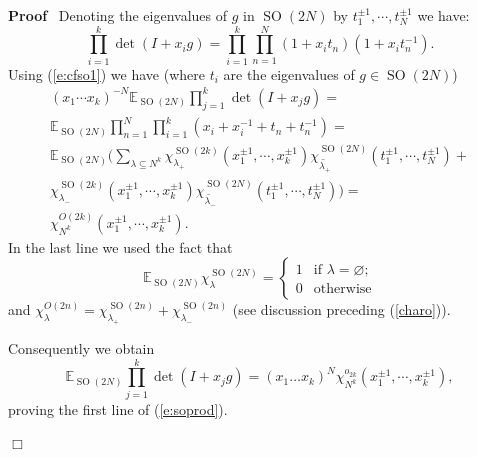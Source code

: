 \documentclass[11pt]{amsart}
\newcommand{\tmop}[1]{\ensuremath{\operatorname{#1}}}
\renewenvironment{proof}{
\noindent\textbf{Proof}\ }{\hspace*{\fill}
\begin{math}\Box\end{math}\medskip}
\begin{document}
\begin{proof}
  Denoting the eigenvalues of $g$ in $\tmop{SO} ( 2 N )$ by $t_1^{\pm 1},
  \cdots, t_N^{\pm 1}$ we have:
  \[ \prod_{i = 1}^k \det ( I + x_i g ) = \prod_{i = 1}^k \prod_{n = 1}^N ( 1
     + x_i t_n ) ( 1 + x_i t_n^{- 1} ) . \]
  Using (\ref{e:cfso1}) we have (where $t_i$ are the eigenvalues of $g \in
  \tmop{SO} ( 2 N )$)
  \begin{eqnarray*}
    & ( x_1 \cdots x_k )^{- N} \mathbb{E}_{\tmop{SO} ( 2 N )} \prod_{j = 1}^k
    \det ( I +  x_j g ) = & \\
    & \mathbb{E}_{\tmop{SO} ( 2 N )} \prod_{n = 1}^N \prod_{i = 1}^k ( x_i +
    x_i^{- 1} + t_n  + t_n^{- 1} ) = & \\
    & \mathbb{E}_{\tmop{SO} ( 2 N )} ( \sum_{\lambda \subseteq N^k}  \chi_{\lambda_+}^{\tmop{SO} ( 2 k )} ( x_1^{\pm
    1}, \cdots, x_k^{\pm 1} ) \chi_{\widetilde{\lambda_+}}^{\tmop{SO} ( 2 N )}
    ( t_1^{\pm 1}, \cdots, t_N^{\pm 1} ) + & \\
    &  \chi_{\lambda_-}^{\tmop{SO} ( 2 k )} (
    x_1^{\pm 1}, \cdots, x_k^{\pm 1} ) \chi_{\widetilde{\lambda_-}}^{\tmop{SO}
    ( 2 N )} ( t_1^{\pm 1}, \cdots, t_N^{\pm 1} ) ) = & \\
    & \chi_{N^k}^{O ( 2 k )} ( x_1^{\pm 1}, \cdots, x_k^{\pm 1} ) . &
  \end{eqnarray*}
  In the last line we used the fact that
  \[ \mathbb{E}_{\tmop{SO} ( 2 N )} \chi_{\lambda}^{\tmop{SO} ( 2 N )} =
     \left\{\begin{array}{ll}
       1 & \text{if $\lambda = \varnothing$;}\\
       0 & \text{otherwise}
     \end{array}\right. \]
  and $\chi_{\lambda}^{O ( 2 n )} = \chi_{\lambda_+}^{\tmop{SO} ( 2 n )} +
  \chi_{\lambda_-}^{\tmop{SO} ( 2 n )}$ (see discussion preceding
  (\ref{charo})).

  Consequently we obtain
  \begin{equation}
    \label{e:so12} \mathbb{E}_{\tmop{SO} ( 2 N )} \prod_{j = 1}^k \det ( I
    +
    x_j g ) = ( x_1 \ldots x_k )^N \chi_{N^k}^{o_{2 k}} ( x_1^{\pm 1}, \cdots,
    x_k^{\pm 1} ),
  \end{equation}
  proving the first line of (\ref{e:soprod}).


\end{proof}
\end{document}
